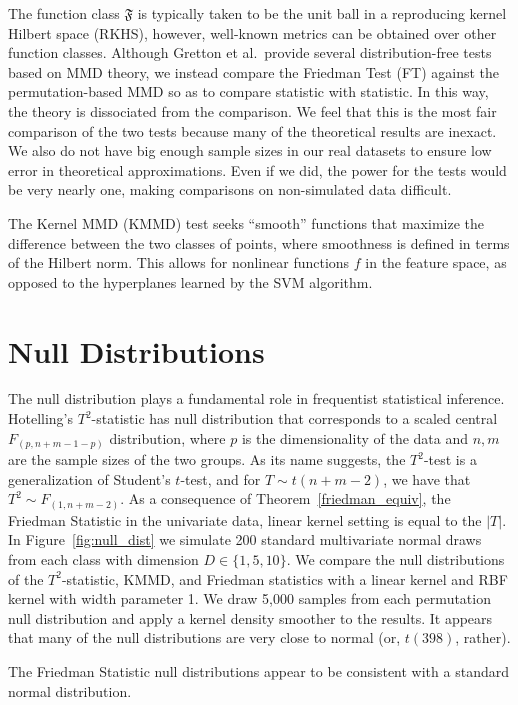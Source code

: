 The function class $\mathfrak{F}$ is typically taken to be the unit ball in a
reproducing kernel Hilbert space (RKHS), however, well-known metrics
can be obtained over other function classes.  Although Gretton et
al.\ provide several distribution-free tests based on MMD theory, we
instead compare the Friedman Test (FT) against the permutation-based
MMD so as to compare statistic with statistic.  In this way, the
theory is dissociated from the comparison.  We feel that this is the
most fair comparison of the two tests because many of the theoretical
results are inexact.  We also do not have big enough sample sizes in
our real datasets to ensure low error in theoretical approximations.
Even if we did, the power for the tests would be very nearly one,
making comparisons on non-simulated data difficult.

The Kernel MMD (KMMD) test seeks ``smooth'' functions that maximize
the difference between the two classes of points, where smoothness
is defined in terms of the Hilbert norm.  This allows for nonlinear
functions $f$ in the feature space, as opposed to the hyperplanes
learned by the SVM algorithm.

\section{Null Distributions}
The null distribution plays a fundamental role in frequentist statistical
inference.  Hotelling's $T^2$-statistic has null distribution that
corresponds to a scaled central $F_{(p, n+m-1-p)}$ distribution, where
$p$ is the dimensionality of the data and $n, m$ are the sample sizes
of the two groups.  As its name suggests, the $T^2$-test is a
generalization of Student's $t$-test, and for $T \sim t(n+m-2)$, we
have that $T^2 \sim F_{(1, n+m-2)}$.  As a consequence of
Theorem~\ref{friedman_equiv}, the Friedman Statistic in the univariate
data, linear kernel setting is equal to the $|T|$.  In Figure~\ref{fig:null_dist} we simulate
200 standard multivariate normal draws from each class with dimension
$D \in \{1, 5, 10\}$.  We compare the null distributions of the
$T^2$-statistic, KMMD, and Friedman statistics with a linear kernel
and RBF kernel with width parameter 1.  We draw 5,000 samples from
each permutation null distribution and apply a kernel density smoother
to the results.  It appears that many of the null distributions are
very close to normal (or, $t(398)$, rather).

The Friedman Statistic null distributions appear to be consistent with
a standard normal distribution.

